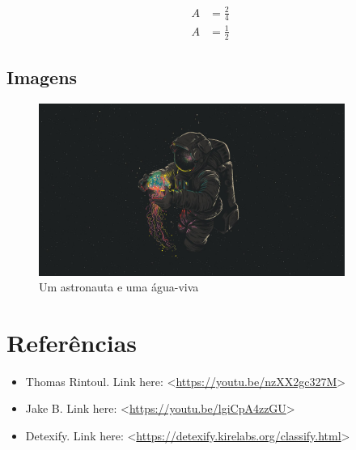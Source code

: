 \documentclass[a4paper, 12pt]{article}
\begin{document}
\begin{equation}
  \begin{split}
    A & = \frac{2}{4} \\
    A & = \frac{1}{2}
  \end{split}
\end{equation}

\subsection{Imagens}
\begin{figure}[h]
  \centering
  \includegraphics[width=10cm]{images/astronaut.png}
  \caption{\small{Um astronauta e uma água-viva}}
  \label{Astronauta}
\end{figure}

\newpage

\section*{Referências}
\begin{itemize} %
  \item Thomas Rintoul. Link here: <\url{https://youtu.be/nzXX2gc327M}>
  \item Jake B. Link here: <\url{https://youtu.be/lgiCpA4zzGU}>
  \item Detexify. Link here: <\url{https://detexify.kirelabs.org/classify.html}>
\end{itemize}
\end{document}
